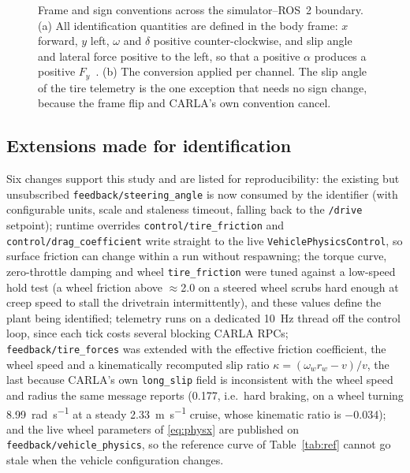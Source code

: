 \begin{figure}[t]
\centering
\resizebox{\textwidth}{!}{}
\caption{Frame and sign conventions across the simulator--ROS~2 boundary.
(a) All identification quantities are defined in the body frame:
$x$ forward, $y$ left, $\omega$ and $\delta$ positive counter-clockwise, and
slip angle and lateral force positive to the left, so that a positive $\alpha$
produces a positive $F_{y}$~\cite{saej670}. (b) The conversion applied per
channel. The slip angle of the tire telemetry is the one exception that needs
no sign change, because the frame flip and CARLA's own convention cancel.}
\label{fig:frames}
\end{figure}

\subsection*{Extensions made for identification}
Six changes support this study and are listed for reproducibility: the
existing but unsubscribed \texttt{feedback/\allowbreak steering\_angle} is now
consumed by the identifier (with configurable units, scale and staleness
timeout, falling back to the \texttt{/drive} setpoint); runtime overrides
\texttt{control/\allowbreak tire\_friction} and
\texttt{control/\allowbreak drag\_coefficient} write straight to the live
\texttt{VehiclePhysicsControl}, so surface friction can change within a run
without respawning; the torque curve, zero-throttle damping and wheel
\texttt{tire\_friction} were tuned against a low-speed hold test (a wheel
friction above $\approx$2.0 on a steered wheel scrubs hard enough at creep
speed to stall the drivetrain intermittently), and these values define the
plant being identified; telemetry runs on a dedicated \SI{10}{\hertz}
thread off the control loop, since each tick costs several blocking CARLA RPCs;
\texttt{feedback/\allowbreak tire\_forces} was extended with the effective
friction coefficient, the wheel speed and a kinematically recomputed slip ratio
$\kappa=(\omega_{w}r_{w}-v)/v$, the last because CARLA's own
\texttt{long\_slip} field is inconsistent with the wheel speed and radius the
same message reports (\num{+0.177}, i.e.\ hard braking, on a wheel turning
\SI{8.99}{\radian\per\second} at a steady \SI{2.33}{\meter\per\second} cruise,
whose kinematic ratio is \num{-0.034}); and the live wheel parameters of
\eqref{eq:physx} are published on
\texttt{feedback/\allowbreak vehicle\_physics}, so the reference curve of
Table~\ref{tab:ref} cannot go stale when the vehicle configuration changes.

